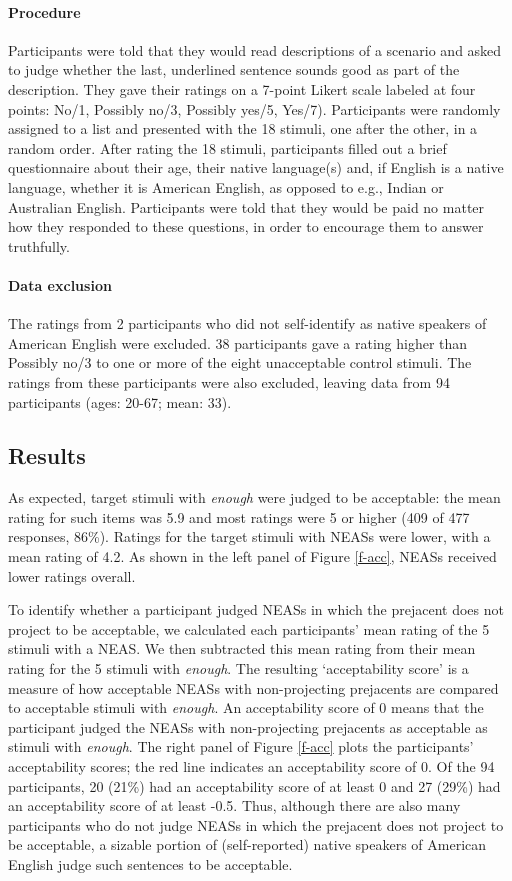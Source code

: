 \documentclass[11pt,fleqn]{article}
\newcommand{\6}{\mbox{$[\hspace*{-.6mm}[$}}
\newcommand{\9}{\mbox{$]\hspace*{-.6mm}]$}}
\begin{document}
\paragraph{Procedure} Participants were told that they would read descriptions of a scenario and asked to judge whether the last, underlined sentence sounds good as part of the description. They gave their ratings on a 7-point Likert scale
labeled at four points: No/1, Possibly no/3, Possibly yes/5,
Yes/7). Participants were randomly assigned to a list and presented with the 18 stimuli, one after the other, in a random order. After rating the 18 stimuli, participants filled out a brief questionnaire about their age, their native language(s) and, if English is a native language, whether it is American English, as opposed to e.g., Indian or Australian English.
Participants were told that they would be paid no matter how they
responded to these questions, in order to encourage them to answer
truthfully.


\paragraph{Data exclusion} 

The ratings from 2 participants who did not self-identify as native speakers of American English were excluded. 38 participants gave a rating higher than Possibly no/3 to one or more of the eight unacceptable control stimuli. The ratings from these participants were also excluded, leaving data from 94 participants (ages: 20-67; mean: 33). 

\subsection{Results}

As expected, target stimuli with {\em enough} were judged to be acceptable: the mean rating for such items was 5.9 and most ratings were 5 or higher (409 of 477 responses,
86\%). Ratings for the target stimuli with NEASs were lower, with a mean rating of 4.2. As shown in the left panel of Figure \ref{f-acc}, NEASs received lower ratings overall.

To identify whether a participant judged NEASs in which the prejacent does not project to be acceptable, we calculated each participants' mean rating of the 5 stimuli with a NEAS. We then subtracted this mean rating from their mean rating for the 5 stimuli with {\em enough}. The resulting `acceptability score' is a measure of how acceptable NEASs with non-projecting prejacents are compared to acceptable stimuli with {\em enough}. An acceptability score of 0 means that the participant judged the NEASs with non-projecting prejacents as acceptable as stimuli with {\em enough}. The right panel of Figure \ref{f-acc} plots the participants' acceptability scores; the red line indicates an acceptability score of 0. Of the 94 participants, 20 (21\%) had an acceptability score of at least 0 and 27 (29\%) had an acceptability score of at least -0.5. Thus, although there are also many participants who do not judge NEASs in which the prejacent does not project to be acceptable, a sizable portion of (self-reported) native speakers of American English judge such sentences to be acceptable.
\end{document}
